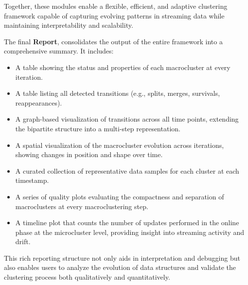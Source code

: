 

Together, these modules enable a flexible, efficient, and adaptive clustering
framework capable of capturing evolving patterns in streaming data while
maintaining interpretability and scalability.

The final \textbf{Report}, consolidates the output of the entire framework into
a comprehensive summary. It includes:
\begin{itemize}
      \item A table showing the status and properties of each macrocluster at every
            iteration.
      \item A table listing all detected transitions (e.g., splits, merges, survivals,
            reappearances).
      \item A graph-based visualization of transitions across all time points, extending
            the bipartite structure into a multi-step representation.
      \item A spatial visualization of the macrocluster evolution across iterations,
            showing changes in position and shape over time.
      \item A curated collection of representative data samples for each cluster at each
            timestamp.
      \item A series of quality plots evaluating the compactness and separation of
            macroclusters at every macroclustering step.
      \item A timeline plot that counts the number of updates performed in the online phase
            at the microcluster level, providing insight into streaming activity and drift.
\end{itemize}

This rich reporting structure not only aids in interpretation and debugging but
also enables users to analyze the evolution of data structures and validate the
clustering process both qualitatively and quantitatively.